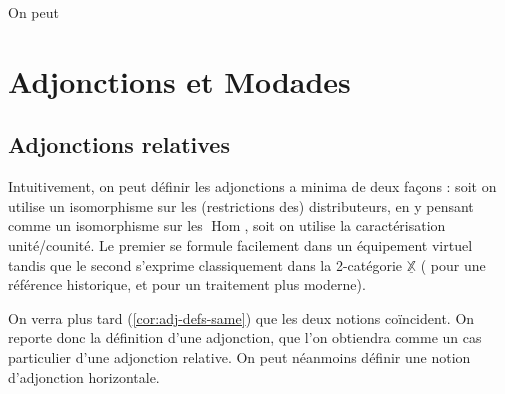 \documentclass[8pt,a4paper,french,draft]{article}
\newcommand{\bb}[1]{\mathbb{#1}}
\DeclareMathOperator{\Hom}{Hom}
\theoremstyle{plain}
\theoremstyle{definition}
\theoremstyle{remark}
\begin{document}
On peut

\section{Adjonctions et Modades}

\subsection{Adjonctions relatives}

Intuitivement, on peut définir les adjonctions a minima de deux façons : soit on utilise un isomorphisme sur les (restrictions des) distributeurs, en y pensant comme un isomorphisme sur les $\Hom$, soit on utilise la caractérisation unité/counité. Le premier se formule facilement dans un équipement virtuel tandis que le second s'exprime classiquement dans la 2-catégorie $\underline{\bb{X}}$ (\cite[p. 762]{maranda} pour une référence historique, \cite[1.1]{auderset_2-cat_adj} et \cite[1.11]{kelly} pour un traitement plus moderne).

On verra plus tard (\ref{cor:adj-defs-same}) que les deux notions coïncident. On reporte donc la définition d'une adjonction, que l'on obtiendra comme un cas particulier d'une adjonction relative. On peut néanmoins définir une notion d'adjonction horizontale.
\end{document}
